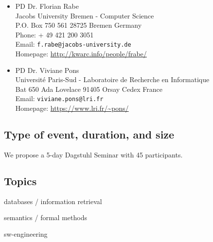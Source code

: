 \documentclass[a4paper,11pt]{article}
\begin{document}
\begin{itemize}
\item PD Dr. Florian Rabe \\
Jacobs University Bremen - Computer Science\\
P.O. Box 750 561
28725 Bremen Germany
\\
Phone: + 49 421 200 3051\\
Email: \texttt{f.rabe@jacobs-university.de}  \\
Homepage: \url{http://kwarc.info/people/frabe/}

\item PD Dr. Viviane Pons \\
Universit\'e Paris-Sud - Laboratoire de Recherche en Informatique\\
Bat 650 Ada Lovelace
91405 Orsay Cedex France 
\\
Email: \texttt{viviane.pons@lri.fr}  \\
Homepage: \url{https://www.lri.fr/~pons/}
\end{itemize}

\subsection{Type of event, duration, and size}

We propose a 5-day Dagstuhl Seminar with 45 participants.

\subsection{Topics}

\begin{compactitem}
 \item databases / information retrieval
 \item semantics / formal methods
 \item sw-engineering
\end{compactitem}
\end{document}

